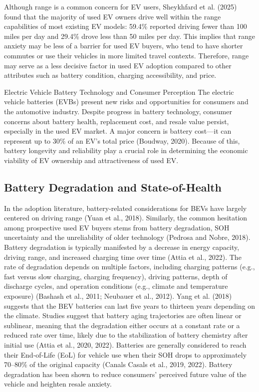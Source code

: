 \documentclass[a4paper,fleqn]{cas-sc}   %
\begin{document}
Although range is a common concern for EV users, Sheykhfard et al. (2025) found that the majority of used EV owners drive well within the range capabilities of most existing EV models: 59.4\% reported driving fewer than 100 miles per day and 29.4\% drove less than 50 miles per day. This implies that range anxiety may be less of a barrier for used EV buyers, who tend to have shorter commutes or use their vehicles in more limited travel contexts. Therefore, range may serve as a less decisive factor in used EV adoption compared to other attributes such as battery condition, charging accessibility, and price.

Electric Vehicle Battery Technology and Consumer Perception
The electric vehicle batteries (EVBs) present new risks and opportunities for consumers and the automotive industry. Despite progress in battery technology, consumer concerns about battery health, replacement cost, and resale value persist, especially in the used EV market. A major concern is battery cost—it can represent up to 30\% of an EV's total price (Boudway, 2020). Because of this, battery longevity and reliability play a crucial role in determining the economic viability of EV ownership and attractiveness of used EV.

\subsection{Battery Degradation and State-of-Health}

In the adoption literature, battery-related considerations for BEVs have largely centered on driving range (Yuan et al., 2018). Similarly, the common hesitation among prospective used EV buyers stems from battery degradation, SOH uncertainty and the unreliability of older technology (Pedrosa and Nobre, 2018).
Battery degradation is typically manifested by a decrease in energy capacity, driving range, and increased charging time over time (Attia et al., 2022). The rate of degradation depends on multiple factors, including charging patterns (e.g., fast versus slow charging, charging frequency), driving patterns, depth of discharge cycles, and operation conditions (e.g., climate and temperature exposure) (Bashash et al., 2011; Neubauer et al., 2012). Yang et al. (2018) suggests that the BEV batteries can last five years to thirteen years depending on the climate. Studies suggest that battery aging trajectories are often linear or sublinear, meaning that the degradation either occurs at a constant rate or a reduced rate over time, likely due to the stabilization of battery chemistry after initial use (Attia et al., 2020, 2022). Batteries are generally considered to reach their End‑of‑Life (EoL) for vehicle use when their SOH drops to approximately 70–80\% of the original capacity (Canals Casals et al., 2019, 2022). Battery degradation has been shown to reduce consumers’ perceived future value of the vehicle and heighten resale anxiety.
\end{document}
